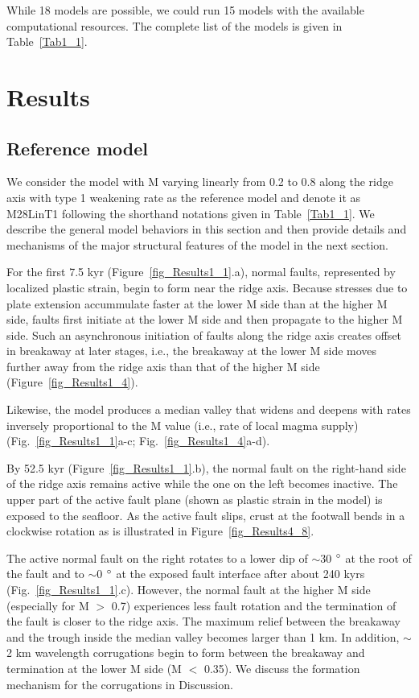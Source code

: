 \documentclass[draft,gc]{agutex}
\begin{document}
\begin{article}
While 18 models are possible, we could run 15 models with the available computational resources. The complete list of the models is given in Table~\ref{Tab1_1}. 

\section{Results}
\subsection{Reference model}\label{sec_M28LinT1}
We consider the model with M varying linearly from 0.2 to 0.8 along the ridge axis with type 1 weakening rate as the reference model and denote it as M28LinT1 following the shorthand notations given in Table~\ref{Tab1_1}. We describe the general model behaviors in this section and then provide details and mechanisms of the major structural features of the model in the next section.

For the first 7.5 kyr (Figure~\ref{fig_Results1_1}.a), normal faults, represented by localized plastic strain, begin to form near the ridge axis. Because stresses due to plate extension accummulate faster at the lower M side than at the higher M side, faults first initiate at the lower M side and then propagate to the higher M side. Such an asynchronous initiation of faults along the ridge axis creates offset in breakaway at later stages, i.e., the breakaway at the lower M side moves further away from the ridge axis than that of the higher M side (Figure~\ref{fig_Results1_4}).

Likewise, the model produces a median valley that widens and deepens with rates inversely proportional to the M value (i.e., rate of local magma supply) (Fig.~\ref{fig_Results1_1}a-c; Fig.~\ref{fig_Results1_4}a-d).

By 52.5 kyr (Figure~\ref{fig_Results1_1}.b), the normal fault on the right-hand side of the ridge axis remains active while the one on the left becomes inactive. The upper part of the active fault plane (shown as plastic strain in the model) is exposed to the seafloor. As the active fault slips, crust at the footwall bends in a clockwise rotation as is illustrated in Figure~\ref{fig_Results4_8}.

The active normal fault on the right rotates to a lower dip of $\sim$30 $\degree$ at the root of the fault and to $\sim$0 $\degree$ at the exposed fault interface after about 240 kyrs (Fig.~\ref{fig_Results1_1}.c). However, the normal fault at the higher M side (especially for M $>$ 0.7) experiences less fault rotation and the termination of the fault is closer to the ridge axis. The maximum relief between the breakaway and the trough inside the median valley becomes larger than 1 km. In addition, $\sim$2 km wavelength corrugations begin to form between the breakaway and termination at the lower M side (M $<$ 0.35). We discuss the formation mechanism for the corrugations in Discussion.


\end{article}
\end{document}
